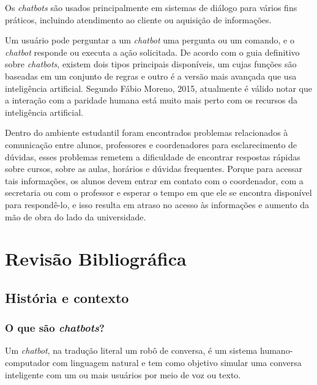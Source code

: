 \documentclass[
	12pt,				%
	oneside,
	a4paper,			%
	english,			%
	french,				%
	spanish,			%
	brazil				%
	]{abntex2}
\begin{document}
Os \emph{chatbots} são usados principalmente em sistemas de diálogo para vários fins práticos, incluindo atendimento ao cliente ou aquisição de informações.
  
Um usuário pode perguntar a um \emph{chatbot} uma pergunta ou um comando, e o \emph{chatbot} responde ou executa a ação solicitada.  
De acordo com o guia definitivo sobre \emph{chatbots}, existem dois tipos principais disponíveis, um cujas funções são baseadas em um conjunto de regras e outro é a versão mais avançada que usa inteligência artificial. 
Segundo Fábio Moreno, 2015, atualmente é válido notar que a interação com a paridade humana está muito mais perto com os recursos da inteligência artificial.

Dentro do ambiente estudantil foram encontrados problemas relacionados à comunicação entre alunos, professores e coordenadores para esclarecimento de dúvidas, esses problemas remetem a dificuldade de encontrar respostas rápidas sobre cursos, sobre as aulas, horários e dúvidas frequentes. Porque para acessar tais informações, os alunos devem entrar em contato com o coordenador, com a secretaria ou com o professor e esperar o tempo em que ele se encontra disponível para respondê-lo, e isso resulta em atraso no acesso às informações e aumento da mão de obra do lado da universidade.  


\part{Revisão Bibliográfica}



\chapter{História e contexto}
\label{cap_trabalho_academico}

\section{O que são \emph{chatbots}?}
Um \emph{chatbot}, na tradução literal um robô de conversa, é um sistema humano-computador com linguagem natural e tem como objetivo simular uma conversa inteligente com um ou mais usuários por meio de voz ou texto. 
\end{document}
